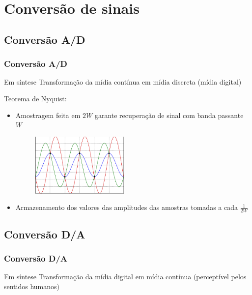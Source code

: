 \documentclass[xcolor]{beamer}
\begin{document}
\section{Conversão de sinais}
\subsection{Conversão A/D}
\begin{frame}
    \frametitle{Conversão A/D}

    Em síntese \implica Transformação da mídia contínua em mídia discreta (mídia
    digital)

    \vspace{0.25cm}

    Teorema de Nyquist:

    \begin{itemize}
        \item Amostragem feita em $2W$ garante recuperação de sinal com banda
              passante $W$
   
              \vspace{0.25cm}
    
              \begin{figure}[htb]
              \centering
                  \includegraphics[width=0.45\textwidth]{imgs/nyquist}
              \end{figure}
        \item Armazenamento dos valores das amplitudes das amostras tomadas a
              cada $\frac{1}{2W}$
    \end{itemize}
\end{frame}

\subsection{Conversão D/A}
\begin{frame}
    \frametitle{Conversão D/A}

    Em síntese \implica Transformação da mídia digital em mídia contínua
    (perceptível pelos sentidos humanos)
\end{frame}
\end{document}
